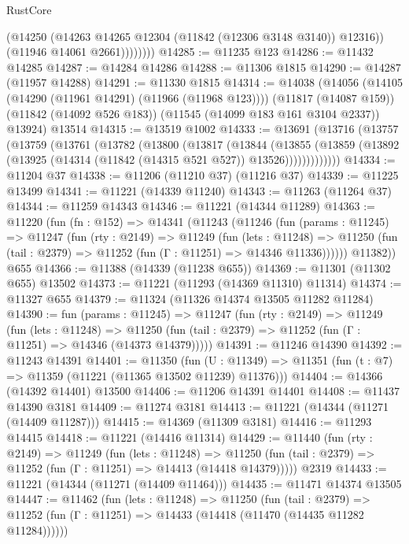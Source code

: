 \begin{lexlean}{RustCore}
\begin{coremodule}
                  (@14250 (@14263 @14265 @12304 (@11842 (@12306 @3148 @3140)) @12316))
                  (@11946 @14061 @2661))))))))
@14285 := @11235 @123
@14286 := @11432 @14285
@14287 := @14284 @14286
@14288 := @11306 @1815
@14290 := @14287 (@11957 @14288)
@14291 := @11330 @1815
@14314 := @14038
    (@14056
      (@14105 (@14290 (@11961 @14291) (@11966 (@11968 @123))))
      (@11817 (@14087 @159))
      (@11842 (@14092 @526 @183))
      (@11545 (@14099 @183 @161 @3104 @2337))
      @13924)
    @13514
@14315 := @13519 @1002
@14333 := @13691
    (@13716
      (@13757
        (@13759
          (@13761
            (@13782
              (@13800
                (@13817
                  (@13844
                    (@13855
                      (@13859
                        (@13892 (@13925 (@14314 (@11842 (@14315 @521 @527)) @13526)))))))))))))
@14334 := @11204 @37
@14338 := @11206 (@11210 @37) (@11216 @37)
@14339 := @11225 @13499
@14341 := @11221 (@14339 @11240)
@14343 := @11263 (@11264 @37)
@14344 := @11259 @14343
@14346 := @11221 (@14344 @11289)
@14363 := @11220
    (fun (fn : @152) =>
    @14341
      (@11243
        (@11246
          (fun (params : @11245) =>
          @11247
            (fun (rty : @2149) =>
            @11249
              (fun (lets : @11248) =>
              @11250 (fun (tail : @2379) => @11252 (fun (Γ : @11251) => @14346 @11336))))))
        @11382))
    @655
@14366 := @11388 (@14339 (@11238 @655))
@14369 := @11301 (@11302 @655) @13502
@14373 := @11221 (@11293 (@14369 @11310) @11314)
@14374 := @11327 @655
@14379 := @11324 (@11326 @14374 @13505 @11282 @11284)
@14390 := fun (params : @11245) =>
  @11247
    (fun (rty : @2149) =>
    @11249
      (fun (lets : @11248) =>
      @11250 (fun (tail : @2379) => @11252 (fun (Γ : @11251) => @14346 (@14373 @14379)))))
@14391 := @11246 @14390
@14392 := @11243 @14391
@14401 := @11350
    (fun (U : @11349) => @11351 (fun (t : @7) => @11359 (@11221 (@11365 @13502 @11239) @11376)))
@14404 := @14366 (@14392 @14401) @13500
@14406 := @11206 @14391 @14401
@14408 := @11437 @14390 @3181
@14409 := @11274 @3181
@14413 := @11221 (@14344 (@11271 (@14409 @11287)))
@14415 := @14369 (@11309 @3181)
@14416 := @11293 @14415
@14418 := @11221 (@14416 @11314)
@14429 := @11440
    (fun (rty : @2149) =>
    @11249
      (fun (lets : @11248) =>
      @11250 (fun (tail : @2379) => @11252 (fun (Γ : @11251) => @14413 (@14418 @14379)))))
    @2319
@14433 := @11221 (@14344 (@11271 (@14409 @11464)))
@14435 := @11471 @14374 @13505
@14447 := @11462
    (fun (lets : @11248) =>
    @11250
      (fun (tail : @2379) =>
      @11252 (fun (Γ : @11251) => @14433 (@14418 (@11470 (@14435 @11282 @11284))))))

\end{coremodule}
\end{lexlean}
